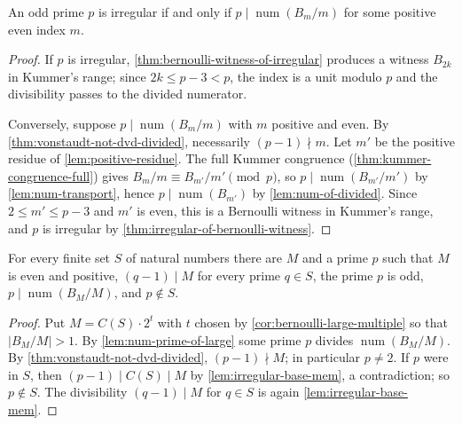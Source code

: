 \begin{theorem}\label{thm:carlitz-criterion}
  \leanok
An odd prime $p$ is irregular if and only if
$p \mid \operatorname{num}(B_m/m)$ for some positive even index $m$.
\end{theorem}
\begin{proof}\leanok
If $p$ is irregular, \cref{thm:bernoulli-witness-of-irregular} produces a
witness $B_{2k}$ in Kummer's range; since $2k \le p-3 < p$, the index is a
unit modulo $p$ and the divisibility passes to the divided numerator.

Conversely, suppose $p\mid\operatorname{num}(B_m/m)$ with $m$ positive and
even.  By \cref{thm:vonstaudt-not-dvd-divided}, necessarily $(p-1)\nmid m$.
Let $m'$ be the positive residue of \cref{lem:positive-residue}.  The full
Kummer congruence (\cref{thm:kummer-congruence-full}) gives
$B_m/m \equiv B_{m'}/m' \pmod p$, so $p\mid\operatorname{num}(B_{m'}/m')$ by
\cref{lem:num-transport}, hence $p \mid \operatorname{num}(B_{m'})$ by
\cref{lem:num-of-divided}.  Since $2 \le m' \le p-3$ and $m'$ is even, this
is a Bernoulli witness in Kummer's range, and $p$ is irregular by
\cref{thm:irregular-of-bernoulli-witness}.
\end{proof}

\begin{theorem}\label{thm:carlitz-numerator-prime}
  \leanok
For every finite set $S$ of natural numbers there are $M$ and a prime $p$
such that $M$ is even and positive, $(q-1)\mid M$ for every prime
$q \in S$, the prime $p$ is odd, $p\mid\operatorname{num}(B_M/M)$, and
$p \notin S$.
\end{theorem}
\begin{proof}\leanok
Put $M = C(S)\cdot 2^t$ with $t$ chosen by
\cref{cor:bernoulli-large-multiple} so that $|B_M/M| > 1$.  By
\cref{lem:num-prime-of-large} some prime $p$ divides
$\operatorname{num}(B_M/M)$.  By \cref{thm:vonstaudt-not-dvd-divided},
$(p-1)\nmid M$; in particular $p \ne 2$.  If $p$ were in $S$, then
$(p-1)\mid C(S)\mid M$ by \cref{lem:irregular-base-mem}, a contradiction; so
$p \notin S$.  The divisibility $(q-1)\mid M$ for $q \in S$ is again
\cref{lem:irregular-base-mem}.
\end{proof}

